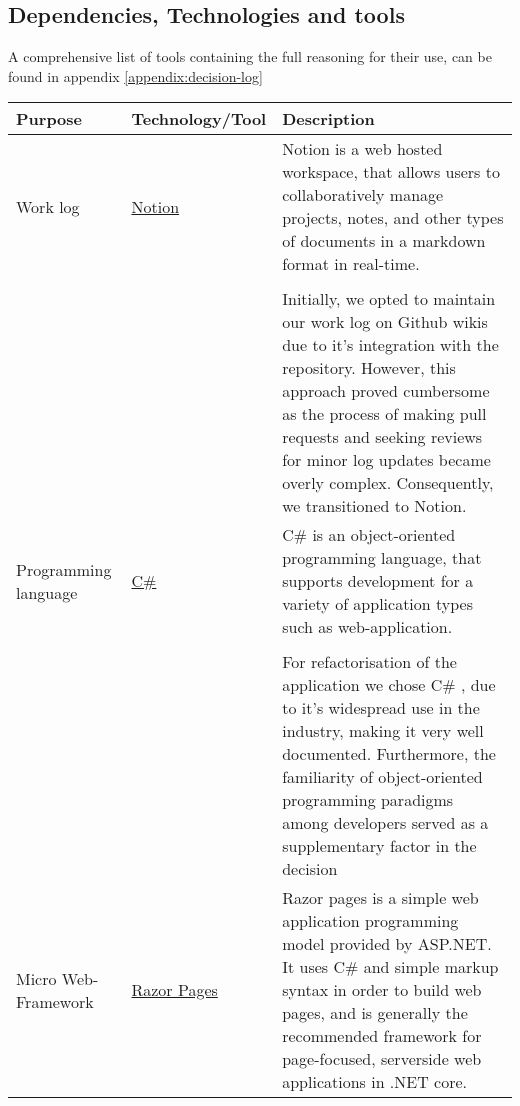 
\subsection{Dependencies, Technologies and tools}


A comprehensive list of tools containing the full reasoning for their use, can be found in appendix \ref{appendix:decision-log}

\begin{longtable}{|p{}|p{} | p{}|}
    \hline
    \textbf{Purpose} & \textbf{Technology/Tool} & \textbf{Description}\\
    \hline
    Work log & \href{https://www.notion.so/help/guides/category/documentation}{Notion} & Notion is a web hosted workspace, that allows users to collaboratively manage projects, notes, and other types of documents in a markdown format in real-time.\\
    &&\\
    && Initially, we opted to maintain our work log on Github wikis due to it's integration with the repository. However, this approach proved cumbersome as the process of making pull requests and seeking reviews for minor log updates became overly complex. Consequently, we transitioned to Notion.\\
    \hline
    Programming language & \href{https://learn.microsoft.com/en-us/dotnet/csharp/}{C\#} &
    C\#  is an object-oriented programming language, that supports development for a variety of application types such as web-application.\\
    && \\
    && For refactorisation of the application we chose C\# , due to it's widespread use in the industry, making it very well documented. Furthermore, the familiarity of object-oriented programming paradigms among developers served as a supplementary factor in the decision\\
    \hline
    Micro Web-Framework & \href{https://learn.microsoft.com/en-us/aspnet/core/razor-pages/?view=aspnetcore-8.0&tabs=visual-studio}{Razor Pages} & Razor pages is a simple web application programming model provided by ASP.NET. It uses C\# and simple markup syntax in order to build web pages, and is generally the recommended framework for page-focused, serverside web applications in .NET core.\\

\end{longtable}
